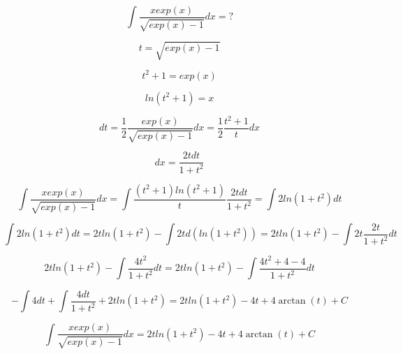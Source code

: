 \documentclass{article}
\begin{document}
\begin{equation}
    \int \frac{x exp(x)}{\sqrt{exp(x)-1}}dx = ?
\end{equation}

\begin{equation}
    t = \sqrt{exp(x)-1}
\end{equation}

\begin{equation}
    t^2+1 = exp(x)
\end{equation}

\begin{equation}
    ln(t^2+1) = x
\end{equation}

\begin{equation*}
    dt = \frac{1}{2} \frac{exp(x)}{\sqrt{exp(x)-1}}dx = \frac{1}{2} \frac{t^2+1}{t}dx
\end{equation*}

\begin{equation}
    dx = \frac{2tdt}{1+t^2}
\end{equation}

\begin{equation*}
    \int \frac{x exp(x)}{\sqrt{exp(x)-1}}dx = \int \frac{(t^2+1)ln(t^2+1)}{t} \frac{2tdt}{1+t^2} = \int 2ln(1+t^2)dt
\end{equation*}

\begin{equation*}
    \int 2ln(1+t^2)dt = 2tln(1+t^2) - \int 2t d(ln(1+t^2)) = 2tln(1+t^2) - \int 2t \frac{2t}{1+t^2}dt
\end{equation*}

\begin{equation*}
    2tln(1+t^2) - \int \frac{4t^2}{1+t^2}dt = 2tln(1+t^2) - \int \frac{4t^2+4-4}{1+t^2}dt
\end{equation*}

\begin{equation*}
    - \int 4dt + \int \frac{4dt}{1+t^2} + 2tln(1+t^2) = 2tln(1+t^2) - 4t + 4 \arctan (t) + C
\end{equation*}

\begin{equation}
    \int \frac{x exp(x)}{\sqrt{exp(x)-1}}dx = 2tln(1+t^2) - 4t + 4 \arctan (t) + C
\end{equation}


\newpage
\end{document}
